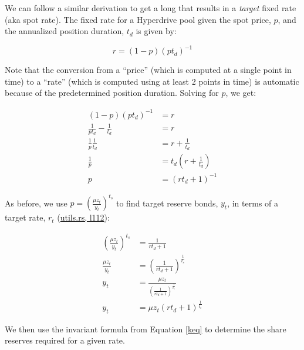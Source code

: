 We can follow a similar derivation to get a long that results in a \textit{target} fixed rate (aka spot rate). The fixed rate for a Hyperdrive pool given the spot price, $p$, and the annualized position duration, $t_{d}$ is given by:

\begin{equation}
r = (1-p)(p t_{d})^{-1}
\end{equation}

Note that the conversion from a ``price'' (which is computed at a single point in time) to a ``rate'' (which is computed using at least 2 points in time) is automatic because of the predetermined position duration.
Solving for $p$, we get:

\begin{equation}
\begin{aligned}
(1-p)(p t_{d})^{-1} &= r \\
\tfrac{1}{p t_{d}} - \tfrac{1}{t_{d}} &= r \\
\tfrac{1}{p} \tfrac{1}{t_{d}}  &= r + \tfrac{1}{t_{d}} \\
\tfrac{1}{p} &= t_{d} \left( r + \tfrac{1}{t_{d}} \right) \\
p &= \left( rt_{d} + 1 \right)^{-1}
\end{aligned}
\end{equation}

As before, we use $p = \left( \tfrac{\mu z_{t}}{y_{t}} \right)^{t_{s}}$ to find target reserve bonds, $y_{t}$, in terms of a target rate, $r_{t}$ (\href{https://github.com/delvtech/hyperdrive/blob/f410574fffcb8b2556208c158494ba2972525843/crates/hyperdrive-math/src/utils.rs#L112}{utils.rs, l112}):

\begin{equation}\label{yt-zt-rate}
\begin{aligned}
\left( \tfrac{\mu z_t}{y_t} \right)^{t_s} &= \tfrac{1}{r t_d + 1} \\
\tfrac{\mu z_t}{y_t} &= \left( \tfrac{1}{r t_d + 1} \right)^{\tfrac{1}{t_s}} \\
y_t &= \tfrac{\mu z_t}{\left( \tfrac{1}{r t_d + 1} \right)^{\tfrac{1}{t_s}}} \\
y_t &= \mu z_t \left( r t_d + 1 \right)^{\tfrac{1}{t_s}}
\end{aligned}
\end{equation}

We then use the invariant formula from Equation \eqref{keq} to determine the share reserves required for a given rate.

